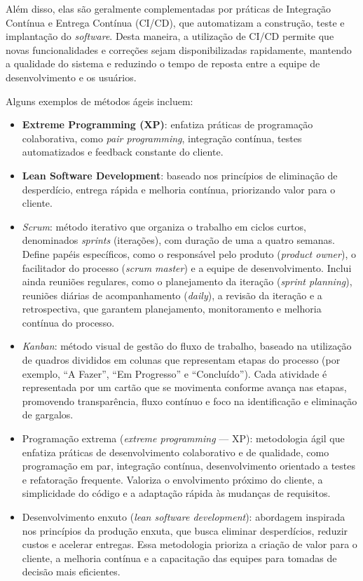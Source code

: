 Além disso, elas são geralmente complementadas por práticas de Integração Contínua e Entrega Contínua (CI/CD), que automatizam a construção, teste e implantação do \textit{software}. Desta maneira, a utilização de CI/CD permite que novas funcionalidades e correções sejam disponibilizadas rapidamente, mantendo a qualidade do sistema e reduzindo o tempo de reposta entre a equipe de desenvolvimento e os usuários.

Alguns exemplos de métodos ágeis incluem:
\begin{itemize}
    \item \textbf{Extreme Programming (XP)}: enfatiza práticas de programação colaborativa, como \textit{pair programming}, integração contínua, testes automatizados e feedback constante do cliente.
    \item \textbf{Lean Software Development}: baseado nos princípios de eliminação de desperdício, entrega rápida e melhoria contínua, priorizando valor para o cliente.
\end{itemize}



\begin{itemize}
    \item \textit{Scrum}: método iterativo que organiza o trabalho em ciclos curtos, denominados \textit{sprints} (iterações), com duração de uma a quatro semanas. Define papéis específicos, como o responsável pelo produto (\textit{product owner}), o facilitador do processo (\textit{scrum master}) e a equipe de desenvolvimento. Inclui ainda reuniões regulares, como o planejamento da iteração (\textit{sprint planning}), reuniões diárias de acompanhamento (\textit{daily}), a revisão da iteração e a retrospectiva, que garantem planejamento, monitoramento e melhoria contínua do processo.
    
    \item \textit{Kanban}: método visual de gestão do fluxo de trabalho, baseado na utilização de quadros divididos em colunas que representam etapas do processo (por exemplo, ``A Fazer'', ``Em Progresso'' e ``Concluído''). Cada atividade é representada por um cartão que se movimenta conforme avança nas etapas, promovendo transparência, fluxo contínuo e foco na identificação e eliminação de gargalos.
    
    \item Programação extrema (\textit{extreme programming} — XP): metodologia ágil que enfatiza práticas de desenvolvimento colaborativo e de qualidade, como programação em par, integração contínua, desenvolvimento orientado a testes e refatoração frequente. Valoriza o envolvimento próximo do cliente, a simplicidade do código e a adaptação rápida às mudanças de requisitos.
    
    \item Desenvolvimento enxuto (\textit{lean software development}): abordagem inspirada nos princípios da produção enxuta, que busca eliminar desperdícios, reduzir custos e acelerar entregas. Essa metodologia prioriza a criação de valor para o cliente, a melhoria contínua e a capacitação das equipes para tomadas de decisão mais eficientes.
\end{itemize}


